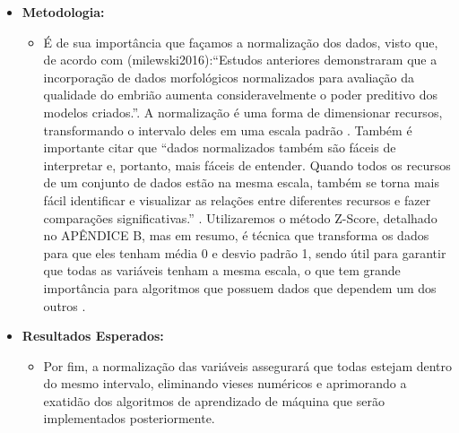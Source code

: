 \begin{itemize}
\begin{itemize}
\begin{itemize}
        \item \textbf{Metodologia:} 
        \begin{itemize}
          \item É de sua importância que façamos a normalização dos dados, visto que, de acordo com \citeonline(milewski2016):“Estudos anteriores demonstraram que a incorporação de dados morfológicos normalizados ​​para avaliação da qualidade do embrião aumenta consideravelmente o poder preditivo dos modelos criados.”. A normalização é uma forma de dimensionar recursos, transformando o intervalo deles em uma escala padrão \cite{jaiswal2024}. Também é importante citar que “dados normalizados também são fáceis de interpretar e, portanto, mais fáceis de entender. Quando todos os recursos de um conjunto de dados estão na mesma escala, também se torna mais fácil identificar e visualizar as relações entre diferentes recursos e fazer comparações significativas.” \cite{jaiswal2024}. Utilizaremos o método Z-Score, detalhado no APÊNDICE B, mas em resumo, é técnica que transforma os dados para que eles tenham média 0 e desvio padrão 1, sendo útil para garantir que todas as variáveis tenham a mesma escala, o que tem grande importância para algoritmos que possuem dados que dependem um dos outros \cite{jaiswal2024}.
        \end{itemize}

        \item \textbf{Resultados Esperados:} 
        \begin{itemize}
          \item Por fim, a normalização das variáveis assegurará que todas estejam dentro do mesmo intervalo, eliminando vieses numéricos e aprimorando a exatidão dos algoritmos de aprendizado de máquina que serão implementados posteriormente.
        \end{itemize}
      \end{itemize}


\end{itemize}
\end{itemize}
